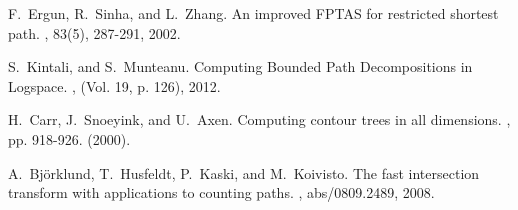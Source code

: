 \documentclass[a4paper,11pt]{report}
\theoremstyle{plain}
\theoremstyle{definition}
\begin{document}
\begin{thebibliography}{10}
F.~Ergun, R.~Sinha, and L.~Zhang.
\newblock An improved FPTAS for restricted shortest path.
, 83(5), 287-291, 2002.

S.~Kintali, and S.~Munteanu.
\newblock Computing Bounded Path Decompositions in Logspace.
, (Vol. 19, p. 126), 2012.

H.~Carr, J.~Snoeyink, and U.~Axen.
\newblock Computing contour trees in all dimensions.
, pp. 918-926. (2000).

A.~Bj{\"o}rklund, T.~Husfeldt, P.~Kaski, and M.~Koivisto.
\newblock The fast intersection transform with applications to counting paths.
, abs/0809.2489, 2008.

\end{thebibliography}
\end{document}

